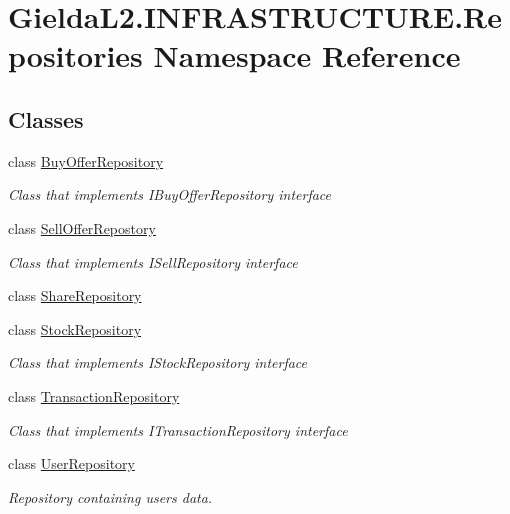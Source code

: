 \hypertarget{namespace_gielda_l2_1_1_i_n_f_r_a_s_t_r_u_c_t_u_r_e_1_1_repositories}{}\section{Gielda\+L2.\+I\+N\+F\+R\+A\+S\+T\+R\+U\+C\+T\+U\+R\+E.\+Repositories Namespace Reference}
\label{namespace_gielda_l2_1_1_i_n_f_r_a_s_t_r_u_c_t_u_r_e_1_1_repositories}
\subsection*{Classes}
\begin{DoxyCompactItemize}
\item 
class \mbox{\hyperlink{class_gielda_l2_1_1_i_n_f_r_a_s_t_r_u_c_t_u_r_e_1_1_repositories_1_1_buy_offer_repository}{Buy\+Offer\+Repository}}
\begin{DoxyCompactList}\small\item\em Class that implements I\+Buy\+Offer\+Repository interface \end{DoxyCompactList}\item 
class \mbox{\hyperlink{class_gielda_l2_1_1_i_n_f_r_a_s_t_r_u_c_t_u_r_e_1_1_repositories_1_1_sell_offer_repostory}{Sell\+Offer\+Repostory}}
\begin{DoxyCompactList}\small\item\em Class that implements I\+Sell\+Repository interface \end{DoxyCompactList}\item 
class \mbox{\hyperlink{class_gielda_l2_1_1_i_n_f_r_a_s_t_r_u_c_t_u_r_e_1_1_repositories_1_1_share_repository}{Share\+Repository}}
\item 
class \mbox{\hyperlink{class_gielda_l2_1_1_i_n_f_r_a_s_t_r_u_c_t_u_r_e_1_1_repositories_1_1_stock_repository}{Stock\+Repository}}
\begin{DoxyCompactList}\small\item\em Class that implements I\+Stock\+Repository interface \end{DoxyCompactList}\item 
class \mbox{\hyperlink{class_gielda_l2_1_1_i_n_f_r_a_s_t_r_u_c_t_u_r_e_1_1_repositories_1_1_transaction_repository}{Transaction\+Repository}}
\begin{DoxyCompactList}\small\item\em Class that implements I\+Transaction\+Repository interface \end{DoxyCompactList}\item 
class \mbox{\hyperlink{class_gielda_l2_1_1_i_n_f_r_a_s_t_r_u_c_t_u_r_e_1_1_repositories_1_1_user_repository}{User\+Repository}}
\begin{DoxyCompactList}\small\item\em Repository containing users data. \end{DoxyCompactList}\end{DoxyCompactItemize}
